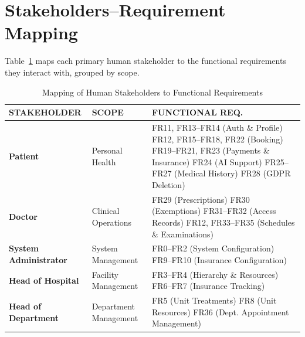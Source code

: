 \documentclass[12pt, a4paper]{article}
\begin{document}
\newpage
\section{Stakeholders--Requirement Mapping}

Table~\ref{tab:user_fr_mapping_fixed} maps each primary human stakeholder to the functional requirements they interact with, grouped by scope. 

\begin{table}[h!]
\centering
\renewcommand{\arraystretch}{1.5}
\begin{tabularx}{\textwidth}{|l|l|X|}
\hline
\rowcolor{gray!30} 
\textbf{STAKEHOLDER} & \textbf{SCOPE} & \textbf{FUNCTIONAL REQ.} \\ \hline

\rowcolor{blue!10}
\textbf{Patient} & Personal Health & 
FR11, FR13--FR14 (Auth \& Profile) \newline
FR12, FR15--FR18, FR22 (Booking) \newline
FR19--FR21, FR23 (Payments \& Insurance) \newline
FR24 (AI Support) \newline
FR25--FR27 (Medical History) \newline
FR28 (GDPR Deletion)  \\ \hline

\rowcolor{green!10}
\textbf{Doctor} & Clinical Operations &
FR29 (Prescriptions) \newline
FR30 (Exemptions) \newline
FR31--FR32 (Access Records) \newline
FR12, FR33--FR35 (Schedules \& Examinations) \\ \hline

\rowcolor{orange!20}
\textbf{System Administrator} & System Management & 
FR0--FR2 (System Configuration) \newline
FR9--FR10 (Insurance Configuration) \\ \hline

\rowcolor{yellow!20}
\textbf{Head of Hospital} & Facility Management & 
FR3--FR4 (Hierarchy \& Resources) \newline
FR6--FR7 (Insurance Tracking)\\ \hline

\rowcolor{yellow!10}
\textbf{Head of Department} & Department Management & 
FR5 (Unit Treatments) \newline
FR8 (Unit Resources)\newline
FR36 (Dept. Appointment Management)  \\ \hline
\end{tabularx}
\caption{Mapping of Human Stakeholders to Functional Requirements}
\label{tab:user_fr_mapping_fixed}
\end{table}
\end{document}

